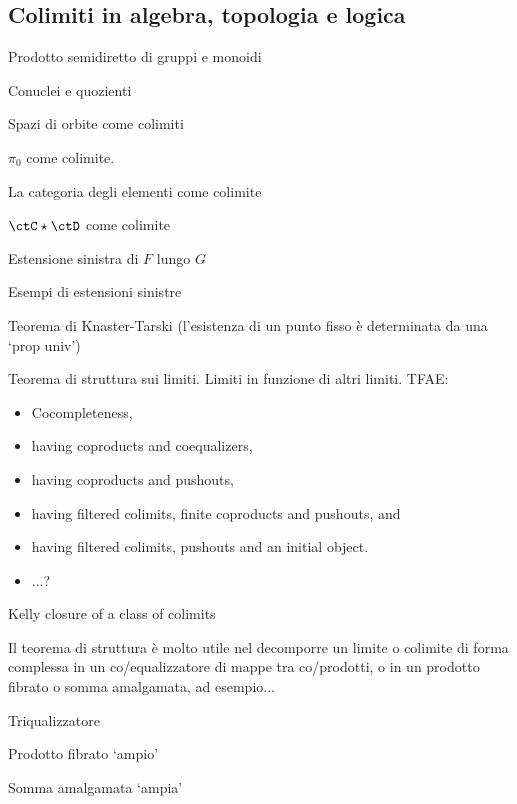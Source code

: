 \subsection{Colimiti in algebra, topologia e logica}
\begin{example}
	Prodotto semidiretto di gruppi e monoidi
\end{example}
\begin{example}

\end{example}
\begin{example}
	Conuclei e quozienti
\end{example}
\begin{example}
	Spazi di orbite come colimiti
\end{example}
\begin{example}
	\(\pi_0\) come colimite.
\end{example}
\begin{example}
	La categoria degli elementi come colimite
\end{example}
\begin{example}
	\(\ctC\star\ctD\) come colimite
\end{example}
\begin{example}
	Estensione sinistra di \(F\) lungo \(G\)
\end{example}
\begin{examples}
	Esempi di estensioni sinistre
\end{examples}
\begin{theorem}
	Teorema di Knaster-Tarski (l'esistenza di un punto fisso è determinata da una `prop univ')
\end{theorem}
\begin{theorem}
	Teorema di struttura sui limiti. Limiti in funzione di altri limiti. TFAE:
	\begin{itemize}
		\item 	Cocompleteness,
		\item having coproducts and coequalizers,
		\item having coproducts and pushouts,
		\item having filtered colimits, finite coproducts and pushouts, and
		\item having filtered colimits, pushouts and an initial object.
		\item ...?
	\end{itemize}
	Kelly closure of a class of colimits
\end{theorem}
Il teorema di struttura è molto utile nel decomporre un limite o colimite di forma complessa in un co/equalizzatore di mappe tra co/prodotti, o in un prodotto fibrato o somma amalgamata, ad esempio...
\begin{example}
	Triqualizzatore
\end{example}
\begin{example}
	Prodotto fibrato `ampio'
\end{example}
\begin{example}
	Somma amalgamata `ampia'
\end{example}
